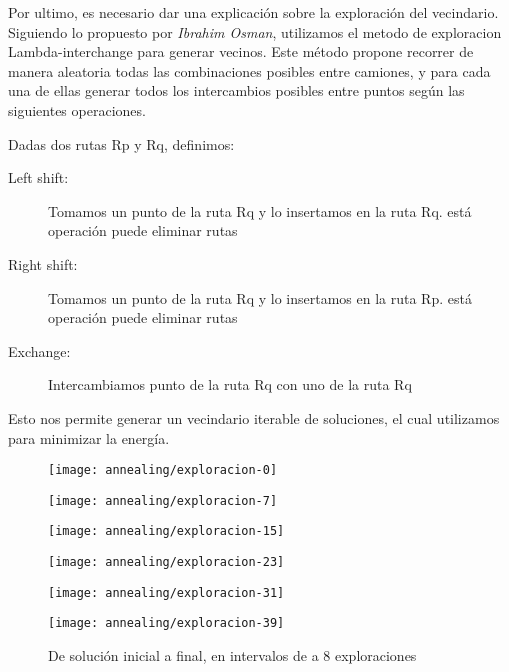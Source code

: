 Por ultimo, es necesario dar una explicación sobre la exploración del vecindario. Siguiendo lo propuesto por \textit{Ibrahim Osman}, utilizamos el metodo de exploracion Lambda-interchange para generar vecinos. Este método propone recorrer de manera aleatoria todas las combinaciones posibles entre camiones, y para cada una de ellas generar todos los intercambios posibles entre puntos según las siguientes operaciones.

Dadas dos rutas Rp y Rq, definimos:

\begin{description}
\item[Left shift:] Tomamos un punto de la ruta Rq y lo insertamos en la ruta Rq. está operación puede eliminar rutas

\item[Right shift:] Tomamos un punto de la ruta Rq y lo insertamos en la ruta Rp. está operación puede eliminar rutas

\item[Exchange:] Intercambiamos punto de la ruta Rq con uno de la ruta Rq
\end{description}

Esto nos permite generar un vecindario iterable de soluciones, el cual utilizamos para minimizar la energía.


\begin{figure}[H]
	\centering
	\begin{minipage}[t]{.3\textwidth}
		\centering
		\texttt{[image: annealing/exploracion-0]}
	\end{minipage}\qquad
	\begin{minipage}[t]{.3\textwidth}
		\centering
		\texttt{[image: annealing/exploracion-7]}
	\end{minipage}\qquad
		\begin{minipage}[t]{.3\textwidth}
		\centering
		\texttt{[image: annealing/exploracion-15]}
	\end{minipage}\qquad
		\begin{minipage}[t]{.3\textwidth}
		\centering
		\texttt{[image: annealing/exploracion-23]}
	\end{minipage}\qquad
	\begin{minipage}[t]{.3\textwidth}
		\centering
		\texttt{[image: annealing/exploracion-31]}
	\end{minipage}\qquad
		\begin{minipage}[t]{.3\textwidth}
		\centering
		\texttt{[image: annealing/exploracion-39]}
	\end{minipage}\qquad
	
De solución inicial a final, en intervalos de a 8 exploraciones
\end{figure}


